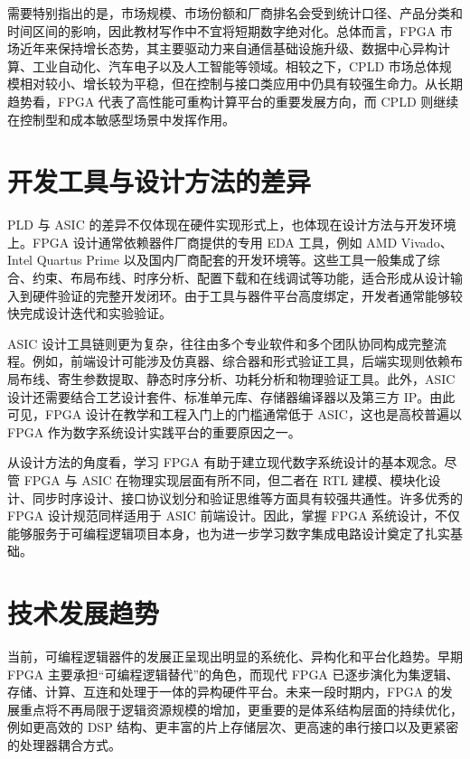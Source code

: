 需要特别指出的是，市场规模、市场份额和厂商排名会受到统计口径、产品分类和时间区间的影响，因此教材写作中不宜将短期数字绝对化。总体而言，FPGA
市场近年来保持增长态势，其主要驱动力来自通信基础设施升级、数据中心异构计算、工业自动化、汽车电子以及人工智能等领域。相较之下，CPLD
市场总体规模相对较小、增长较为平稳，但在控制与接口类应用中仍具有较强生命力。从长期趋势看，FPGA
代表了高性能可重构计算平台的重要发展方向，而 CPLD
则继续在控制型和成本敏感型场景中发挥作用。

\section{开发工具与设计方法的差异}\label{ux5f00ux53d1ux5de5ux5177ux4e0eux8bbeux8ba1ux65b9ux6cd5ux7684ux5deeux5f02}

PLD 与 ASIC
的差异不仅体现在硬件实现形式上，也体现在设计方法与开发环境上。FPGA
设计通常依赖器件厂商提供的专用 EDA 工具，例如 AMD Vivado、Intel Quartus
Prime
以及国内厂商配套的开发环境等。这些工具一般集成了综合、约束、布局布线、时序分析、配置下载和在线调试等功能，适合形成从设计输入到硬件验证的完整开发闭环。由于工具与器件平台高度绑定，开发者通常能够较快完成设计迭代和实验验证。

ASIC
设计工具链则更为复杂，往往由多个专业软件和多个团队协同构成完整流程。例如，前端设计可能涉及仿真器、综合器和形式验证工具，后端实现则依赖布局布线、寄生参数提取、静态时序分析、功耗分析和物理验证工具。此外，ASIC
设计还需要结合工艺设计套件、标准单元库、存储器编译器以及第三方
IP。由此可见，FPGA 设计在教学和工程入门上的门槛通常低于
ASIC，这也是高校普遍以 FPGA 作为数字系统设计实践平台的重要原因之一。

从设计方法的角度看，学习 FPGA 有助于建立现代数字系统设计的基本观念。尽管
FPGA 与 ASIC 在物理实现层面有所不同，但二者在 RTL
建模、模块化设计、同步时序设计、接口协议划分和验证思维等方面具有较强共通性。许多优秀的
FPGA 设计规范同样适用于 ASIC 前端设计。因此，掌握 FPGA
系统设计，不仅能够服务于可编程逻辑项目本身，也为进一步学习数字集成电路设计奠定了扎实基础。

\section{技术发展趋势}\label{ux6280ux672fux53d1ux5c55ux8d8bux52bf}

当前，可编程逻辑器件的发展正呈现出明显的系统化、异构化和平台化趋势。早期
FPGA 主要承担``可编程逻辑替代''的角色，而现代 FPGA
已逐步演化为集逻辑、存储、计算、互连和处理于一体的异构硬件平台。未来一段时期内，FPGA
的发展重点将不再局限于逻辑资源规模的增加，更重要的是体系结构层面的持续优化，例如更高效的
DSP
结构、更丰富的片上存储层次、更高速的串行接口以及更紧密的处理器耦合方式。

